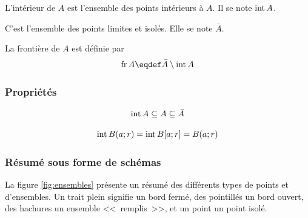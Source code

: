 \begin{mydef}[Intérieur]
	L'intérieur de $A$ est l'ensemble des points intérieurs à $A$.
	Il se note $\operatorname{int} A$.
\end{mydef}

\begin{mydef} [Fermeture]
	C'est l'ensemble des points limites et isolés.
	Elle se note $\bar{A}$.
\end{mydef}

\begin{mydef} [Frontière] La frontière de $A$ est définie par
	\[ \newfr A \eqdef \bar{A} \setminus \newint A \]
\end{mydef}

\subsubsection{Propriétés}

\begin{myprop}
	\[ \operatorname{int} A \subseteq A \subseteq \bar{A} \]
\end{myprop}

\begin{myprop}
	\[ \operatorname{int} B(a; r) = \operatorname{int} B[a; r] = B(a; r) \]
\end{myprop}

\subsubsection{Résumé sous forme de schémas}

La figure \ref{fig:ensembles} présente un résumé des différents types de points et d'ensembles. Un trait plein signifie un bord fermé, des pointillés un bord ouvert, des hachures un ensemble <<~remplis~>>, et un point un point isolé.

